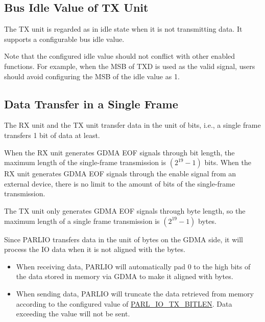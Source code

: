 \documentclass[main\_\_EN.tex]{subfiles}
\begin{document}
\subsection{Bus Idle Value of TX Unit}\label{subsec:parlio-tx-bus-idle-value}

The TX unit is regarded as in idle state when it is not transmitting data. It supports a configurable bus idle value.

Note that the configured idle value should not conflict with other enabled functions. For example, when the MSB of TXD is used as the valid signal, users should avoid configuring the MSB of the idle value as 1.

\subsection{Data Transfer in a Single Frame}

The RX unit and the TX unit transfer data in the unit of bits, i.e., a single frame transfers 1 bit of data at least.

When the RX unit generates GDMA EOF signals through bit length, the maximum length of the single-frame transmission is \begin{math} (2^{19}-1) \end{math} bits. When the RX unit generates GDMA EOF signals through the enable signal from an external device, there is no limit to the amount of bits of the single-frame transmission.

The TX unit only generates GDMA EOF signals through byte length, so the maximum length of a single frame transmission is \begin{math} (2^{19}-1) \end{math} bytes.

Since PARLIO transfers data in the unit of bytes on the GDMA side, it will process the IO data when it is not aligned with the bytes.

\begin{itemize}
    \item When receiving data, PARLIO will automatically pad 0 to the high bits of the data stored in memory via GDMA to make it aligned with bytes.
    \item When sending data, PARLIO will truncate the data retrieved from memory according to the configured value of \hyperref[fielddesc:PARLIOTXBITLEN]{PARL\_IO\_TX\_BITLEN}. Data exceeding the value will not be sent.
\end{itemize}
\end{document}

